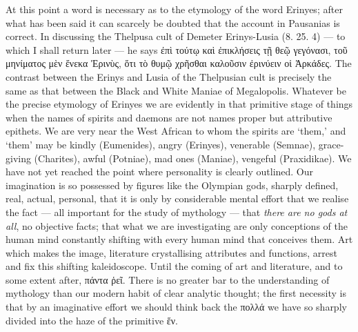 \documentclass[a4paper, 11pt, oneside, polutonikogreek, english]{article}
\begin{document}
At this point a word is necessary as to the etymology of the word Erinyes; after what has been said it can scarcely be doubted that the account in Pausanias is correct. In discussing the Thelpusa cult of Demeter Erinys-Lusia (8. 25. 4) --- to which I shall return later --- he says ἐπὶ τούτῳ καὶ ἐπικλήσεις τῇ θεῷ γεγόνασι, τοῦ μηνίματος μὲν ἕνεκα Ἐρινὺς, ὅτι τὸ θυμῷ χρῆσθαι καλοῦσιν ἐρινύειν οἱ Ἀρκάδες. The contrast between the Erinys and Lusia of the Thelpusian cult is precisely the same as that between the Black and White Maniae of Megalopolis. Whatever be the precise etymology of Erinyes we are evidently in that primitive stage of things when the names of spirits and daemons are not names proper but attributive epithets. We are very near the West African to whom the spirits are `them,' and `them' may be kindly (Eumenides), angry (Erinyes), venerable (Semnae), grace-giving (Charites), awful (Potniae), mad ones (Maniae), vengeful (Praxidikae). We have not yet reached the point where personality is clearly outlined. Our imagination is so possessed by figures like the Olympian gods, sharply defined, real, actual, personal, that it is only by considerable mental effort that we realise the fact --- all important for the study of mythology --- that \emph{there are no gods at all}, no objective facts; that what we are investigating are only conceptions of the human mind constantly shifting with every human mind that conceives them. Art which makes the image, literature crystallising attributes and functions, arrest and fix this shifting kaleidoscope. Until the coming of art and literature, and to some extent after, πάντα ῥεῖ. There is no greater bar to the understanding of mythology than our modern habit of clear analytic thought; the first necessity is that by an imaginative effort we should think back the πολλά we have so sharply divided into the haze of the primitive ἕν.
\end{document}
